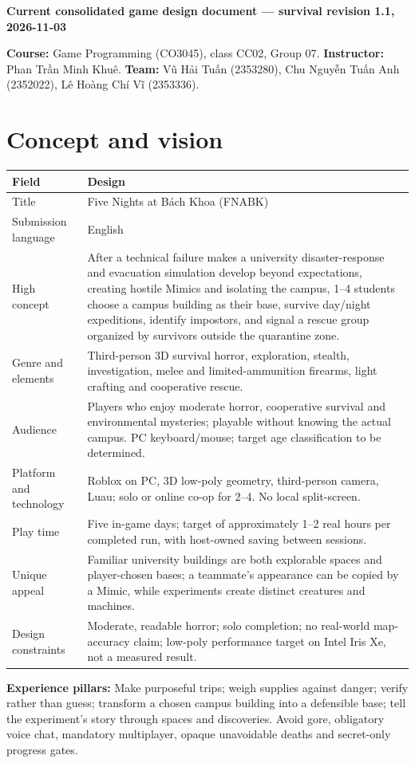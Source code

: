 \textbf{Current consolidated game design document --- survival revision 1.1, 2026-11-03}

\textbf{Course:} Game Programming (CO3045), class CC02, Group 07. \textbf{Instructor:} Phan Trần Minh Khuê. \textbf{Team:} Vũ Hải Tuấn (2353280), Chu Nguyễn Tuấn Anh (2352022), Lê Hoàng Chí Vĩ (2353336).


\section{Concept and vision}
\begin{longtable}{@{}p{}p{}@{}}
\toprule
\textbf{Field} & \textbf{Design} \\ \midrule\endhead
Title & Five Nights at Bách Khoa (FNABK) \\
Submission language & English \\
High concept & After a technical failure makes a university disaster-response and evacuation simulation develop beyond expectations, creating hostile Mimics and isolating the campus, 1--4 students choose a campus building as their base, survive day/night expeditions, identify impostors, and signal a rescue group organized by survivors outside the quarantine zone. \\
Genre and elements & Third-person 3D survival horror, exploration, stealth, investigation, melee and limited-ammunition firearms, light crafting and cooperative rescue. \\
Audience & Players who enjoy moderate horror, cooperative survival and environmental mysteries; playable without knowing the actual campus. PC keyboard/mouse; target age classification to be determined. \\
Platform and technology & Roblox on PC, 3D low-poly geometry, third-person camera, Luau; solo or online co-op for 2--4. No local split-screen. \\
Play time & Five in-game days; target of approximately 1--2 real hours per completed run, with host-owned saving between sessions. \\
Unique appeal & Familiar university buildings are both explorable spaces and player-chosen bases; a teammate's appearance can be copied by a Mimic, while experiments create distinct creatures and machines. \\
Design constraints & Moderate, readable horror; solo completion; no real-world map-accuracy claim; low-poly performance target on Intel Iris Xe, not a measured result. \\
\bottomrule
\end{longtable}
\textbf{Experience pillars:} Make purposeful trips; weigh supplies against danger; verify rather than guess; transform a chosen campus building into a defensible base; tell the experiment's story through spaces and discoveries. Avoid gore, obligatory voice chat, mandatory multiplayer, opaque unavoidable deaths and secret-only progress gates.

